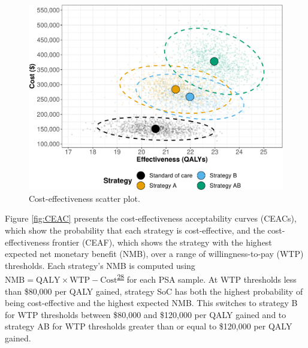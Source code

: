 \documentclass[
]{article}
\begin{document}
\begin{figure}[H]

{\centering \includegraphics{figs/CE-scatter-1} 

}

\caption{Cost-effectiveness scatter plot.}\label{fig:CE-scatter}
\end{figure}

Figure \ref{fig:CEAC} presents the cost-effectiveness acceptability curves (CEACs), which show the probability that each strategy is cost-effective, and the cost-effectiveness frontier (CEAF), which shows the strategy with the highest expected net monetary benefit (NMB), over a range of willingness-to-pay (WTP) thresholds. Each strategy's NMB is computed using \(\text{NMB} = \text{QALY} \times \text{WTP} - \text{Cost}\)\textsuperscript{\protect\hyperlink{ref-Stinnett1998b}{28}} for each PSA sample. At WTP thresholds less than \$80,000 per QALY gained, strategy SoC has both the highest probability of being cost-effective and the highest expected NMB. This switches to strategy B for WTP thresholds between \$80,000 and \$120,000 per QALY gained and to strategy AB for WTP thresholds greater than or equal to \$120,000 per QALY gained.
\end{document}
